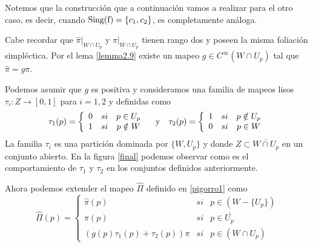 \documentclass[a4paper,10pt]{book}
\begin{document}
Notemos que la construcci\'on que a continuaci\'on vamos a realizar para el otro caso, es decir, cuando ${\rm Sing(f)}=\{c_{1},c_{2}\}$, es completamente an\'aloga.  
\vspace{5mm}

Cabe recordar que $\hat{\pi}|_{W\cap U_{p}}$ y $\pi|_{W\cap U_{p}}$ tienen rango dos y poseen la misma foliaci\'on simpl\'ectica. Por el lema \ref{lemma2.9} existe un mapeo $g\in C^{\infty}(W\cap U_{p})$ tal que $\hat{\pi}=g\pi$.
\vspace{5mm}

Podemos asumir que $g$ es positiva y consideramos una familia de mapeos lisos $\tau_{i}:Z\to[0,1]$ para $i=1,2$ y definidas como 
$$\tau_{1}(p) = \left\{ \begin{array}{lcc}
                                     0 &   si  & p\in U_{p}\\
                                     1 &   si  & p\notin W
                                     \end{array}
                            \right. \quad{\rm y}\quad
\tau_{2}(p) = \left\{ \begin{array}{lcc}
                                     1 &   si  & p\notin U_{p}\\
                                     0 &   si  & p\in W
                                     \end{array}
                            \right.$$
La familia $\tau_{i}$ es una partici\'on dominada por $\{W,U_{p}\}$ y donde $Z\subset\bar{W\cap U_{p}}$ en un conjunto abierto. En la figura \ref{final} podemos observar como es el comportamiento de $\tau_{1}$ y $\tau_{2}$ en los conjuntos definidos anteriormente.

\vspace{5mm}
Ahora podemos extender el mapeo $\hat{\Pi}$ definido en \ref{pigorro1} como  
\begin{equation}\label{pigorro1final}
                \hat{\Pi}(p) = \left\{ \begin{array}{lcl}
                                     \hat{\pi}(p)                           & si & p\in (W-\{U_{p}\})\\
                                     \pi(p)                                 & si & p\in \bar{U_{p}}\\
                                     \left(g(p)\tau_{1}(p)+\tau_{2}(p)\right)\pi & si & p\in (W\cap U_{p}) 
                                     \end{array}
                            \right.
\end{equation}
\end{document}
